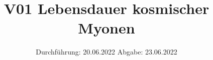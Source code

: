 

\subject{Fortgeschrittenenpraktikum}
\title{V01 Lebensdauer kosmischer Myonen}
\date{%
  Durchführung: 20.06.2022
  \hspace{3em}
  Abgabe: 23.06.2022
}



\maketitle
\thispagestyle{empty}
\tableofcontents
\newpage






%

\printbibliography{}




